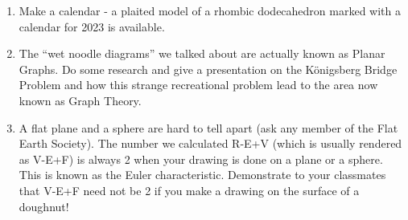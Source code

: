 \begin{enumerate}
    \item Make a calendar - a plaited model of a rhombic dodecahedron marked with a calendar for 2023 is available.
       
    \item The ``wet noodle diagrams'' we talked about are actually known as Planar Graphs.  Do some research and give a presentation on the K\"{o}nigsberg Bridge Problem and how this strange recreational problem lead to the area now known as Graph Theory.
        
    \item A flat plane and a sphere are hard to tell apart (ask any member of the Flat Earth Society).  The number we calculated R-E+V (which is usually rendered as V-E+F) is always 2 when your drawing is done on a plane or a sphere.  This is known as the Euler characteristic.  Demonstrate to your classmates that V-E+F need not be 2 if you make a drawing on the surface of a doughnut!
    
\end{enumerate}
